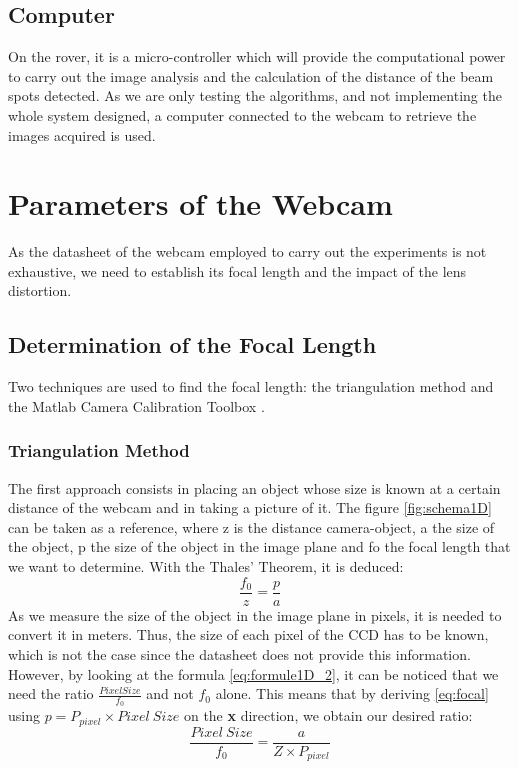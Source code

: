 \subsection{Computer}
On the rover, it is a micro-controller which will provide the computational power to carry out the image analysis and the calculation of the distance of the beam spots detected. As we are only testing the algorithms, and not implementing the whole system designed, a computer connected to the webcam to retrieve the images acquired is used. 

\section{Parameters of the Webcam}
As the datasheet of the webcam employed to carry out the experiments is not exhaustive, we need to establish its focal length and the impact of the lens distortion.

\subsection{Determination of the Focal Length}
Two techniques are used to find the focal length: the triangulation method and the Matlab Camera Calibration Toolbox \cite{matlabtoolbox}.

\subsubsection{Triangulation Method}
The first approach consists in placing an object whose size is known at a certain distance of the webcam and in taking a picture of it. The figure \ref{fig:schema1D} can be taken as a reference, where z is the distance camera-object, a the size of the object, p the size of the object in the image plane and fo the focal length that we want to determine. With the Thales' Theorem, it is deduced:
\begin{equation}
\frac{f_0}{z} = \frac{p}{a}
\label{eq:focal}
\end{equation}
As we measure the size of the object in the image plane in pixels, it is needed to convert it in meters. Thus, the size of each pixel of the CCD has to be known, which is not the case since the datasheet does not provide this information. However, by looking at the formula \eqref{eq:formule1D_2}, it can be noticed that we need the ratio $\frac{Pixel Size}{f_0}$ and not $f_0$ alone. This means that by deriving \eqref{eq:focal} using $p = P_{pixel} \times Pixel \ Size$ on the \textbf{x} direction, we obtain our desired ratio:
\begin{equation*}
\frac{Pixel \ Size}{f_0} = \frac{a}{Z \times P_{pixel}}
\end{equation*}

